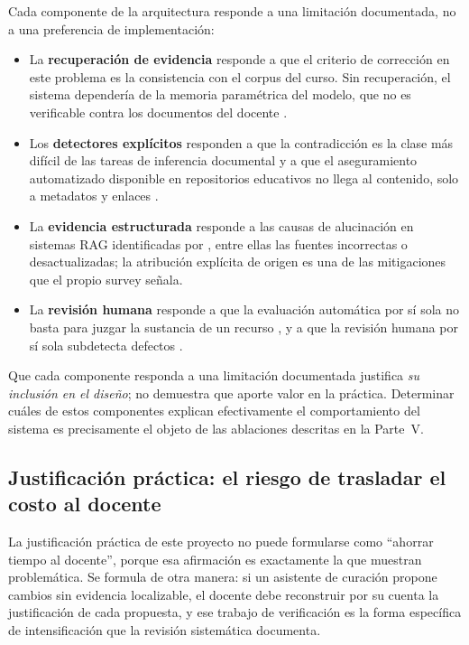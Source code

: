 Cada componente de la arquitectura responde a una limitación documentada, no a una
preferencia de implementación:

\begin{itemize}
  \item La \textbf{recuperación de evidencia} responde a que el criterio de
        corrección en este problema es la consistencia con el corpus del curso. Sin
        recuperación, el sistema dependería de la memoria paramétrica del modelo, que
        no es verificable contra los documentos del docente
        \parencite{lewis2020retrieval}.
  \item Los \textbf{detectores explícitos} responden a que la contradicción es la
        clase más difícil de las tareas de inferencia documental
        \parencite{koreeda2021contractnli,gubelmann2024capturing} y a que el
        aseguramiento automatizado disponible en repositorios educativos no llega al
        contenido, solo a metadatos y enlaces \parencite{clements2015open}.
  \item La \textbf{evidencia estructurada} responde a las causas de alucinación en
        sistemas RAG identificadas por \textcite{huang2025survey}, entre ellas las
        fuentes incorrectas o desactualizadas; la atribución explícita de origen es
        una de las mitigaciones que el propio survey señala.
  \item La \textbf{revisión humana} responde a que la evaluación automática por sí
        sola no basta para juzgar la sustancia de un recurso
        \parencite{tabares2017modelo,clements2015open}, y a que la revisión humana
        por sí sola subdetecta defectos \parencite{xie2018systematic}.
\end{itemize}

\begin{advertencia}
Que cada componente responda a una limitación documentada justifica \emph{su
inclusión en el diseño}; no demuestra que aporte valor en la práctica. Determinar
cuáles de estos componentes explican efectivamente el comportamiento del sistema es
precisamente el objeto de las ablaciones descritas en la Parte~V.
\end{advertencia}

\subsection{Justificación práctica: el riesgo de trasladar el costo al docente}
\label{sec:just-practica}

La justificación práctica de este proyecto no puede formularse como
\enquote{ahorrar tiempo al docente}, porque esa afirmación es exactamente la que
\textcite{su2026efficiency} muestran problemática. Se formula de otra manera: si un
asistente de curación propone cambios sin evidencia localizable, el docente debe
reconstruir por su cuenta la justificación de cada propuesta, y ese trabajo de
verificación es la forma específica de intensificación que la revisión sistemática
documenta.

